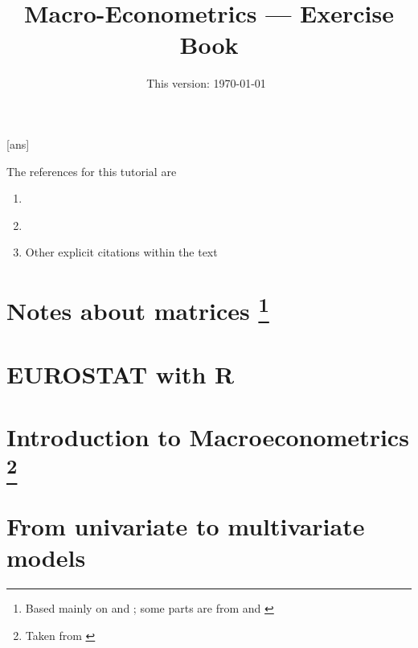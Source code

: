 \documentclass[11pt]{article}
\begin{document}
[ans]

\title{Macro-Econometrics --- Exercise Book}

\author{}

\date{This version: \today ~\currenttime}

\maketitle

The references for this tutorial are
\begin{enumerate}[label=\roman*.]
    \item \cite{MartinHurnHarris-2012}
    \item \cite{Mutschler-2018-github_repo}
    \item Other explicit citations within the text
\end{enumerate}

\section{Notes about matrices\texorpdfstring{%
      \protect\footnote{Based mainly on \cite{MagnusNeudecker-2019-part1} and \cite{MagnusNeudecker-2019-part2}; some parts are from \cite[][]{Hamilton-1994} and \cite[][]{Mutschler-2018-github_repo}}%
  }{}}


\section{EUROSTAT with R}


\section{Introduction to Macroeconometrics\texorpdfstring{%
      \protect\footnote{Taken from \cite[][see the section no 1, titled ``Macroeconometrics''.]{Mutschler-2018-github_repo}}%
  }{}}


\section{From univariate to multivariate models}

\end{document}
